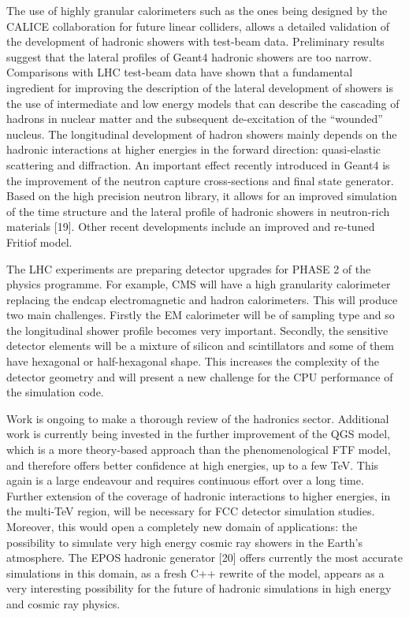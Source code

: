 \documentclass[12pt,a4paper]{article}
\begin{document}
The use of highly granular calorimeters such as the ones being designed
by the CALICE collaboration for future linear colliders, allows a
detailed validation of the development of hadronic showers with
test-beam data. Preliminary results suggest that the lateral profiles of
Geant4 hadronic showers are too narrow. Comparisons with LHC test-beam
data have shown that a fundamental ingredient for improving the
description of the lateral development of showers is the use of
intermediate and low energy models that can describe the cascading of
hadrons in nuclear matter and the subsequent de-excitation of the
``wounded'' nucleus. The longitudinal development of hadron showers
mainly depends on the hadronic interactions at higher energies in the
forward direction: quasi-elastic scattering and diffraction. An
important effect recently introduced in Geant4 is the improvement of the
neutron capture cross-sections and final state generator. Based on the
high precision neutron library, it allows for an improved simulation of
the time structure and the lateral profile of hadronic showers in
neutron-rich materials {[}19{]}. Other recent developments include an
improved and re-tuned Fritiof model.

The LHC experiments are preparing detector upgrades for PHASE 2 of the
physics programme. For example, CMS will have a high granularity
calorimeter replacing the endcap electromagnetic and hadron
calorimeters. This will produce two main challenges. Firstly the EM
calorimeter will be of sampling type and so the longitudinal shower
profile becomes very important. Secondly, the sensitive detector
elements will be a mixture of silicon and scintillators and some of them
have hexagonal or half-hexagonal shape. This increases the complexity of
the detector geometry and will present a new challenge for the CPU
performance of the simulation code.

Work is ongoing to make a thorough review of the hadronics sector.
Additional work is currently being invested in the further improvement
of the QGS model, which is a more theory-based approach than the
phenomenological FTF model, and therefore offers better confidence at
high energies, up to a few TeV. This again is a large endeavour and
requires continuous effort over a long time. Further extension of the
coverage of hadronic interactions to higher energies, in the multi-TeV
region, will be necessary for FCC detector simulation studies. Moreover,
this would open a completely new domain of applications: the possibility
to simulate very high energy cosmic ray showers in the Earth's
atmosphere. The EPOS hadronic generator {[}20{]} offers currently the
most accurate simulations in this domain, as a fresh C++ rewrite of the
model, appears as a very interesting possibility for the future of
hadronic simulations in high energy and cosmic ray physics.
\end{document}
